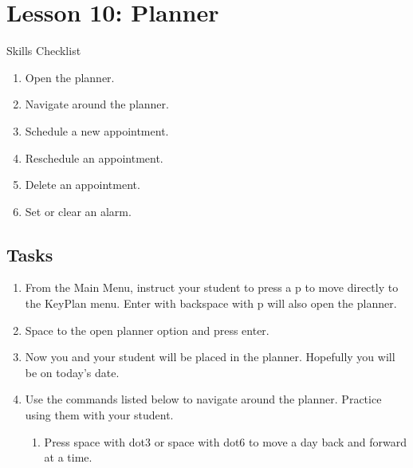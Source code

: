 \documentclass[10pt,letterpaper,twoside]{report}
\begin{document}
{{{{\section*{Lesson 10: Planner}


Skills Checklist



\begin{enumerate}
	\item Open the planner.
	      
	\item Navigate around the planner.
	      
	\item Schedule a new appointment.
	      
	\item Reschedule an appointment.
	      
	\item Delete an appointment.
	      
	\item Set or clear an alarm.
\end{enumerate}



 \subsection{Tasks}



\begin{enumerate}
	\item From the Main Menu, instruct your student to press a p to move directly to the KeyPlan menu.  Enter with backspace with p will also open the planner.
	      
	\item Space to the open planner option and press enter.
	      
	\item Now you and your student will be placed in the planner.  Hopefully you will be on today's date.
	      
	\item Use the commands listed below to navigate around the planner.  Practice using them with your student.
	      
	      \begin{enumerate}
		      \item Press space with dot3 or space with dot6 to move a day back and forward at a time.
		            

\end{enumerate}
\end{enumerate}}}}}
\end{document}
